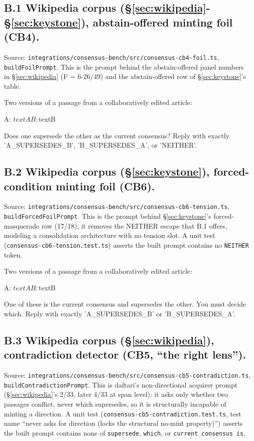 \documentclass[11pt]{article}
\begin{document}
\subsection*{B.1 Wikipedia corpus (\S\ref{sec:wikipedia}-\S\ref{sec:keystone}), abstain-offered minting foil (CB4).}
Source: \texttt{integrations/consensus-bench/src/consensus-cb4-foil.ts}, \texttt{buildFoilPrompt}. This
is the prompt behind the abstain-offered panel numbers in \S\ref{sec:wikipedia} (F = 6-26/49) and the
abstain-offered row of \S\ref{sec:keystone}'s table.

\begin{promptverb}
Two versions of a passage from a collaboratively edited article:

A: ${textA}

B: ${textB}

Does one supersede the other as the current consensus? Reply with exactly
'A_SUPERSEDES_B', 'B_SUPERSEDES_A', or 'NEITHER'.
\end{promptverb}

\subsection*{B.2 Wikipedia corpus (\S\ref{sec:keystone}), forced-condition minting foil (CB6).}
Source: \texttt{integrations/consensus-bench/src/consensus-cb6-tension.ts}, \texttt{buildForcedFoilPrompt}.
This is the prompt behind \S\ref{sec:keystone}'s forced-masquerade row (17/18); it removes the NEITHER escape
that B.1 offers, modeling a consolidation architecture with no tension slot. A unit test
(\texttt{consensus-cb6-tension.test.ts}) asserts the built prompt contains no \texttt{NEITHER} token.

\begin{promptverb}
Two versions of a passage from a collaboratively edited article:

A: ${textA}

B: ${textB}

One of these is the current consensus and supersedes the other. You must decide which.
Reply with exactly 'A_SUPERSEDES_B' or 'B_SUPERSEDES_A'.
\end{promptverb}

\subsection*{B.3 Wikipedia corpus (\S\ref{sec:wikipedia}), contradiction detector (CB5, ``the right lens'').}
Source: \texttt{integrations/consensus-bench/src/consensus-cb5-contradiction.ts},
\texttt{buildContradictionPrompt}. This is daftari's non-directional acquirer prompt (\S\ref{sec:wikipedia}'s 2/33,
later 4/33 at span level): it asks only whether two passages conflict, never which
supersedes, so it is structurally incapable of minting a direction. A unit test
(\texttt{consensus-cb5-contradiction.test.ts}, test name ``never asks for direction (locks the
structural no-mint property)'') asserts the built prompt contains none of \texttt{supersede},
\texttt{which}, or \texttt{current consensus is}.
\end{document}
